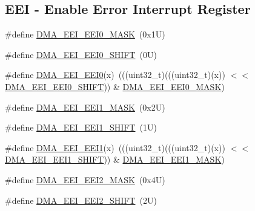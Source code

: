 \subsection*{E\+EI -\/ Enable Error Interrupt Register}
\begin{DoxyCompactItemize}
\item 
\#define \mbox{\hyperlink{group___d_m_a___register___masks_gaacd526dbbb455151535c6e8d7e371477}{D\+M\+A\+\_\+\+E\+E\+I\+\_\+\+E\+E\+I0\+\_\+\+M\+A\+SK}}~(0x1\+U)
\item 
\#define \mbox{\hyperlink{group___d_m_a___register___masks_gac4abb698bc75b24811557b2037d828c6}{D\+M\+A\+\_\+\+E\+E\+I\+\_\+\+E\+E\+I0\+\_\+\+S\+H\+I\+FT}}~(0\+U)
\item 
\#define \mbox{\hyperlink{group___d_m_a___register___masks_ga225960b9b72978580c4514cb9a49b99e}{D\+M\+A\+\_\+\+E\+E\+I\+\_\+\+E\+E\+I0}}(x)~(((uint32\+\_\+t)(((uint32\+\_\+t)(x)) $<$$<$ \mbox{\hyperlink{group___d_m_a___register___masks_gac4abb698bc75b24811557b2037d828c6}{D\+M\+A\+\_\+\+E\+E\+I\+\_\+\+E\+E\+I0\+\_\+\+S\+H\+I\+FT}})) \& \mbox{\hyperlink{group___d_m_a___register___masks_gaacd526dbbb455151535c6e8d7e371477}{D\+M\+A\+\_\+\+E\+E\+I\+\_\+\+E\+E\+I0\+\_\+\+M\+A\+SK}})
\item 
\#define \mbox{\hyperlink{group___d_m_a___register___masks_gabb59616391e640e07162d0d33c0382d9}{D\+M\+A\+\_\+\+E\+E\+I\+\_\+\+E\+E\+I1\+\_\+\+M\+A\+SK}}~(0x2\+U)
\item 
\#define \mbox{\hyperlink{group___d_m_a___register___masks_ga9c162765569a8cc74e648841337f09e2}{D\+M\+A\+\_\+\+E\+E\+I\+\_\+\+E\+E\+I1\+\_\+\+S\+H\+I\+FT}}~(1\+U)
\item 
\#define \mbox{\hyperlink{group___d_m_a___register___masks_ga15f77103df38751a98da522a466096ff}{D\+M\+A\+\_\+\+E\+E\+I\+\_\+\+E\+E\+I1}}(x)~(((uint32\+\_\+t)(((uint32\+\_\+t)(x)) $<$$<$ \mbox{\hyperlink{group___d_m_a___register___masks_ga9c162765569a8cc74e648841337f09e2}{D\+M\+A\+\_\+\+E\+E\+I\+\_\+\+E\+E\+I1\+\_\+\+S\+H\+I\+FT}})) \& \mbox{\hyperlink{group___d_m_a___register___masks_gabb59616391e640e07162d0d33c0382d9}{D\+M\+A\+\_\+\+E\+E\+I\+\_\+\+E\+E\+I1\+\_\+\+M\+A\+SK}})
\item 
\#define \mbox{\hyperlink{group___d_m_a___register___masks_ga24c1e04e6f4916148ed252a53df2055f}{D\+M\+A\+\_\+\+E\+E\+I\+\_\+\+E\+E\+I2\+\_\+\+M\+A\+SK}}~(0x4\+U)
\item 
\#define \mbox{\hyperlink{group___d_m_a___register___masks_ga1455b4521842d7f51307bd79c2524b4e}{D\+M\+A\+\_\+\+E\+E\+I\+\_\+\+E\+E\+I2\+\_\+\+S\+H\+I\+FT}}~(2\+U)
\item 

\end{DoxyCompactItemize}
